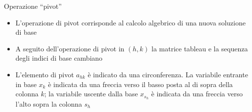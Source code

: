 \documentclass{beamer}
\begin{document}
\begin{frame}[allowframebreaks]{Operazione ``pivot''}
\begin{itemize}
\item L'operazione di pivot corrisponde al calcolo algebrico di una
nuova soluzione di base

\item A seguito dell'operazione di pivot in $(h, k)$ la matrice tableau
e la sequenza degli indici di base cambiano

\item L'elemento di pivot $a_{hk}$  \`e indicato da una circonferenza.
La variabile entrante in base $x_k$ \`e indicata da una freccia
verso il basso posta al di sopra della colonna $k$; la variabile
uscente dalla base $x_{s_h}$ \`e indicata da una freccia verso
l'alto sopra la colonna $s_h$
\end{itemize}
\end{frame}
\end{document}
